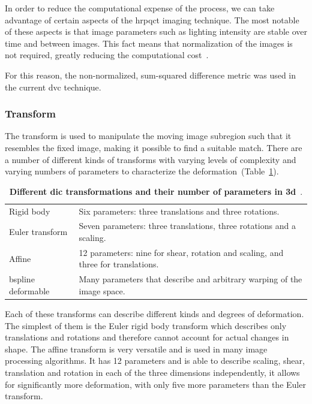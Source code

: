 In order to reduce the computational expense of the process, we can take advantage of certain aspects of the \ac{hrpqct} imaging technique.
The most notable of these aspects is that image parameters such as lighting intensity are stable over time and between images.
This fact means that normalization of the images is not required, greatly reducing the computational cost~\citep{pan_two-dimensional_2009}.

For this reason, the non-normalized, sum-squared difference metric was used in the current \ac{dvc} technique.

\subsubsection{Transform}
\label{sec:dvc_implement_register_transform}
The transform is used to manipulate the moving image subregion such that it resembles the fixed image, making it possible to find a suitable match.
There are a number of different kinds of transforms with varying levels of complexity and varying numbers of parameters to characterize the deformation~(Table~\ref{tab:transforms}).

\begin{table}
\caption[Spacial transformations]{\textbf{Different \acs*{dic} transformations and their number of parameters in \acs*{3d}}~\citep{ibanez_itk_2003}.}
\label{tab:transforms}
\begin{tabularx}{\textwidth}{l X}
\toprule
	Rigid body & Six parameters: three translations and three rotations.\\
	Euler transform & Seven parameters: three translations, three rotations and a scaling. \\
	Affine & 12 parameters: nine for shear, rotation and scaling, and three for translations.\\
	\ac{bspline} deformable & Many parameters that describe and arbitrary warping of the image space. \\
\bottomrule
\end{tabularx}
\end{table}

Each of these transforms can describe different kinds and degrees of deformation.
The simplest of them is the Euler rigid body transform which describes only translations and rotations and therefore cannot account for actual changes in shape.
The affine transform is very versatile and is used in many image processing algorithms.
It has 12 parameters and is able to describe scaling, shear, translation and rotation in each of the three dimensions independently, it allows for significantly more deformation, with only five more parameters than the Euler transform.

